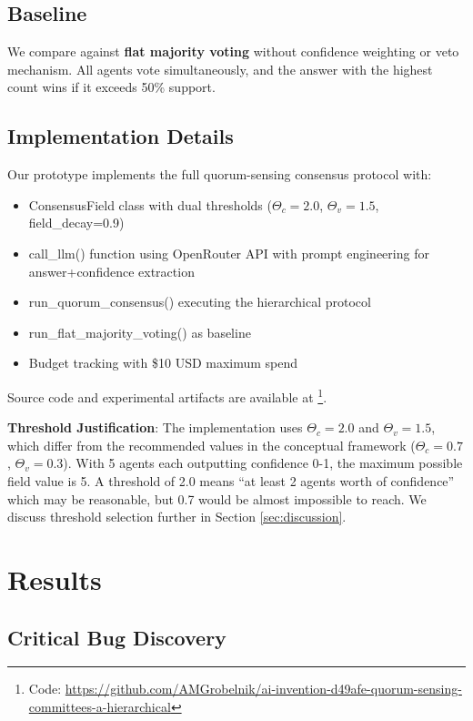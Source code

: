\documentclass[11pt,letterpaper]{article}
\begin{document}
\subsection{Baseline}

We compare against \textbf{flat majority voting} without confidence weighting or veto mechanism. All agents vote simultaneously, and the answer with the highest count wins if it exceeds 50\% support.

\subsection{Implementation Details}

Our prototype implements the full quorum-sensing consensus protocol with:

\begin{itemize}
\item ConsensusField class with dual thresholds ($\Theta_c=2.0$, $\Theta_v=1.5$, field\_decay=0.9)
\item call\_llm() function using OpenRouter API with prompt engineering for answer+confidence extraction
\item run\_quorum\_consensus() executing the hierarchical protocol
\item run\_flat\_majority\_voting() as baseline
\item Budget tracking with \$10 USD maximum spend
\end{itemize}

Source code and experimental artifacts are available at \footnote{Code: \url{https://github.com/AMGrobelnik/ai-invention-d49afe-quorum-sensing-committees-a-hierarchical}}.

\textbf{Threshold Justification}: The implementation uses $\Theta_c=2.0$ and $\Theta_v=1.5$, which differ from the recommended values in the conceptual framework ($\Theta_c=0.7$, $\Theta_v=0.3$). With 5 agents each outputting confidence 0-1, the maximum possible field value is 5. A threshold of 2.0 means ``at least 2 agents worth of confidence'' which may be reasonable, but 0.7 would be almost impossible to reach. We discuss threshold selection further in Section \ref{sec:discussion}.

\section{Results}
\label{sec:results}

\subsection{Critical Bug Discovery}
\end{document}
